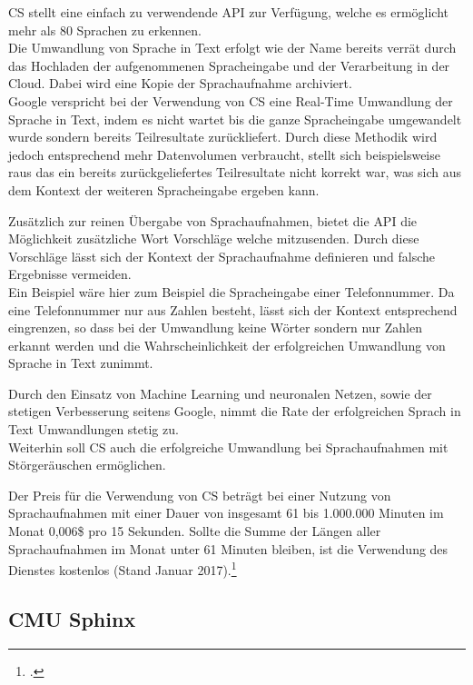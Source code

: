 \ac{CS} stellt eine einfach zu verwendende API zur Verfügung, welche es ermöglicht mehr als 80 Sprachen zu erkennen.\\
Die Umwandlung von Sprache in Text erfolgt wie der Name bereits verrät durch das Hochladen der aufgenommenen Spracheingabe und der Verarbeitung in der Cloud. Dabei wird eine Kopie der Sprachaufnahme archiviert.\\
Google verspricht bei der Verwendung von \ac{CS} eine Real-Time Umwandlung der Sprache in Text, indem es nicht wartet bis die ganze Spracheingabe umgewandelt wurde sondern bereits Teilresultate zurückliefert. Durch diese Methodik wird jedoch entsprechend mehr Datenvolumen verbraucht, stellt sich beispielsweise raus das ein bereits zurückgeliefertes Teilresultate nicht korrekt war, was sich aus dem Kontext der weiteren Spracheingabe ergeben kann.

Zusätzlich zur reinen Übergabe von Sprachaufnahmen, bietet die \ac{API} die Möglichkeit zusätzliche Wort Vorschläge welche mitzusenden. Durch diese Vorschläge lässt sich der Kontext der Sprachaufnahme definieren und falsche Ergebnisse vermeiden.\\
Ein Beispiel wäre hier zum Beispiel die Spracheingabe einer Telefonnummer. Da eine Telefonnummer nur aus Zahlen besteht, lässt sich der Kontext entsprechend eingrenzen, so dass bei der Umwandlung keine Wörter sondern nur Zahlen erkannt werden und die Wahrscheinlichkeit der erfolgreichen Umwandlung von Sprache in Text zunimmt.

Durch den Einsatz von Machine Learning und neuronalen Netzen, sowie der stetigen Verbesserung seitens Google, nimmt die Rate der erfolgreichen Sprach in Text Umwandlungen stetig zu.\\
Weiterhin soll \ac{CS} auch die erfolgreiche Umwandlung bei Sprachaufnahmen mit Störgeräuschen ermöglichen.

Der Preis für die Verwendung von \ac{CS} beträgt bei einer Nutzung von Sprachaufnahmen mit einer Dauer von insgesamt 61 bis 1.000.000 Minuten im Monat 0,006\$ pro 15 Sekunden. Sollte die Summe der Längen aller Sprachaufnahmen im Monat unter 61 Minuten bleiben, ist die Verwendung des Dienstes kostenlos (Stand Januar 2017).\footcite[vgl.:][]{cloudSpeechAPI}

\subsection{CMU Sphinx}
\label{sctcmu}

